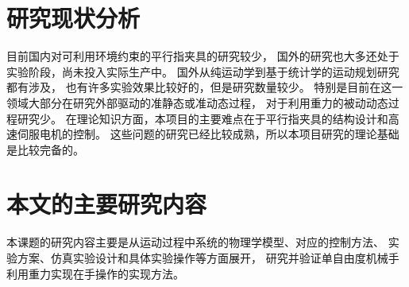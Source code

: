 \section{研究现状分析}
目前国内对可利用环境约束的平行指夹具的研究较少，
国外的研究也大多还处于实验阶段，尚未投入实际生产中。
国外从纯运动学到基于统计学的运动规划研究都有涉及，
也有许多实验效果比较好的，但是研究数量较少。
特别是目前在这一领域大部分在研究外部驱动的准静态或准动态过程，
对于利用重力的被动动态过程研究少。
在理论知识方面，本项目的主要难点在于平行指夹具的结构设计和高速伺服电机的控制。
这些问题的研究已经比较成熟，所以本项目研究的理论基础是比较完备的。

\section{本文的主要研究内容}
本课题的研究内容主要是从运动过程中系统的物理学模型、对应的控制方法、
实验方案、仿真实验设计和具体实验操作等方面展开，
研究并验证单自由度机械手利用重力实现在手操作的实现方法。

